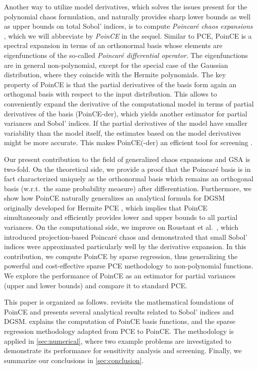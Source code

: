 \documentclass[a4paper,11pt]{article}
\renewcommand{\citep}[2][]{\cite[#1]{#2}}
\theoremstyle{definition}
\theoremstyle{remark}
\theoremstyle{theorem}
\begin{document}
Another way to utilize model derivatives, which solves the issues present for the polynomial chaos formulation, and naturally provides sharp lower bounds as well as upper bounds on total Sobol' indices, 
is to compute
\textit{Poincar\'e chaos expansions} \citep{rougam20}, which we will abbreviate by \textit{PoinCE} in the sequel.
Similar to PCE, PoinCE is a spectral expansion
in terms of an orthonormal basis whose elements are eigenfunctions of the so-called \textit{Poincar\'e differential operator}. 
The eigenfunctions are in general non-polynomial, except for the special case of the Gaussian distribution, where they coincide with the Hermite polynomials.
The key property of PoinCE is that the partial derivatives of the basis form again an orthogonal basis with respect to the input distribution. 
This allows to conveniently expand the derivative of the computational model in terms of partial derivatives of the basis (PoinCE-der), which yields another estimator for partial variances and Sobol' indices. 
If the partial derivatives of the model have smaller variability
than the model itself, the estimates based on the model derivatives might be more accurate. This makes PoinCE(-der) an efficient tool for screening \citep{rougam20}.

Our present contribution to the field of generalized chaos expansions and GSA is two-fold. 
On the theoretical side, we provide a proof that the Poincar\'e basis is in fact characterized uniquely as the orthonormal basis which remains an orthogonal basis (w.r.t.\ the same probability measure) after differentiation.
Furthermore, we show how PoinCE naturally generalizes an analytical formula for DGSM originally developed for Hermite PCE \citep{sudmai15}, which implies that PoinCE simultaneously and efficiently provides lower and upper bounds to all partial variances.
On the computational side, we improve on Roustant et al.~\cite{rougam20}, which introduced projection-based Poincar\'e chaos and demonstrated that small Sobol' indices were approximated particularly well by the derivative expansion. 
In this contribution, we compute PoinCE by sparse regression, thus generalizing the powerful and cost-effective sparse PCE methodology to non-polynomial functions.
We explore the performance of PoinCE as an estimator for partial variances (upper and lower bounds) and compare it to standard PCE.



This paper is organized as follows.
 revisits the mathematical foundations of PoinCE and presents several analytical results related to Sobol' indices and DGSM.
 explains the computation of PoinCE basis functions, and the sparse regression methodology adapted from PCE to PoinCE. 
The methodology is applied in \cref{sec:numerical}, where two example problems are investigated to demonstrate its performance for sensitivity analysis and screening.
Finally, we summarize our conclusions in \cref{sec:conclusion}.
\end{document}
